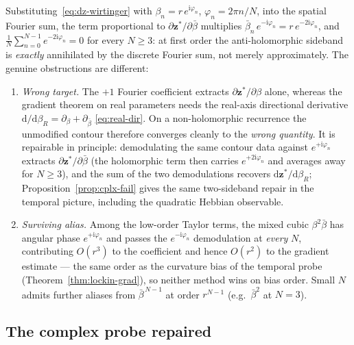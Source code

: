 \documentclass[11pt]{article}
\newcommand{\im}{\mathrm{i}}
\newcommand{\dd}{\mathrm{d}}
\newcommand{\eg}{e.g.}
\theoremstyle{definition}
\begin{document}
Substituting~\eqref{eq:dz-wirtinger} with $\beta_n = r\,e^{\im\varphi_n}$,
$\varphi_n = 2\pi n/N$, into the spatial Fourier sum, the term
proportional to $\partial\bm{z}^*/\partial\bar\beta$ multiplies
$\bar\beta_n\,e^{-\im\varphi_n} = r\,e^{-2\im\varphi_n}$, and
$\tfrac1N\sum_{n=0}^{N-1}e^{-2\im\varphi_n}=0$ for every $N\ge3$: at
first order the anti-holomorphic sideband is \emph{exactly} annihilated
by the discrete Fourier sum, not merely approximately.  The genuine
obstructions are different:
\begin{enumerate}[label=(\roman*)]
\item \emph{Wrong target.}  The $+1$ Fourier coefficient extracts
$\partial\bm{z}^*/\partial\beta$ alone, whereas the gradient theorem on
real parameters needs the real-axis directional derivative
$\dd/\dd\beta_R = \partial_\beta+\partial_{\bar\beta}$
\eqref{eq:real-dir}.  On a non-holomorphic recurrence the unmodified
contour therefore converges cleanly to the \emph{wrong quantity}.  It
is repairable in principle: demodulating the same contour data against
$e^{+\im\varphi_n}$ extracts $\partial\bm{z}^*/\partial\bar\beta$ (the
holomorphic term then carries $e^{+2\im\varphi_n}$ and averages away
for $N\ge3$), and the sum of the two demodulations recovers
$\dd\bm{z}^*/\dd\beta_R$; Proposition~\ref{prop:cplx-fail} gives the
same two-sideband repair in the temporal picture, including the
quadratic Hebbian observable.
\item \emph{Surviving alias.}  Among the low-order Taylor terms, the
mixed cubic $\beta^2\bar\beta$ has angular phase $e^{+\im\varphi_n}$ and
passes the $e^{-\im\varphi_n}$ demodulation at \emph{every} $N$,
contributing $O(r^3)$ to the coefficient and hence $O(r^2)$ to the
gradient estimate --- the same order as the curvature bias of the
temporal probe (Theorem~\ref{thm:lockin-grad}), so neither method wins
on bias order.  Small $N$ admits further aliases from
$\bar\beta^{\,N-1}$ at order $r^{N-1}$ (\eg\ $\bar\beta^2$ at $N=3$).
\end{enumerate}

\subsection*{The complex probe repaired}
\end{document}
